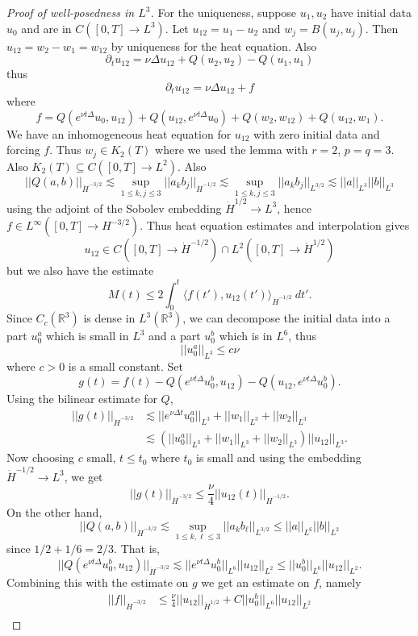 \documentclass[12pt]{book}
\newcommand{\RR}{\mathbb{R}}
\theoremstyle{definition}
\begin{document}
\begin{proof}[Proof of well-posedness in $L^3$]
For the uniqueness, suppose $u_1, u_2$ have initial data $u_0$ and are in $C([0, T] \to L^3)$.
Let $u_{12} = u_1 - u_2$ and $w_j = B(u_j, u_j)$. Then $u_{12} = w_2 - w_1 = w_{12}$ by uniqueness for the heat equation.
Also
$$\partial_t u_{12} = \nu \Delta u_{12} + Q(u_2, u_2) - Q(u_1, u_1)$$
thus
$$\partial_t u_{12} = \nu \Delta u_{12} + f$$
where
$$f = Q(e^{\nu t \Delta} u_0, u_{12}) + Q(u_{12}, e^{\nu t \Delta} u_0) + Q(w_2, w_{12}) + Q(u_{12}, w_1).$$
We have an inhomogeneous heat equation for $u_{12}$ with zero initial data and forcing $f$.
Thus $w_j \in K_2(T)$ where we used the lemma with $r = 2$, $p = q = 3$.
Also $K_2(T) \subseteq C([0, T] \to L^2)$.
Also
$$||Q(a, b)||_{\dot H^{-3/2}} \lesssim \sup_{1 \leq k, j \leq 3} ||a_k b_j||_{\dot H^{-1/2}} \lesssim \sup_{1 \leq k, j \leq 3} ||a_k b_j||_{L^{3/2}} \lesssim ||a||_{L^3} ||b||_{L^3}$$
using the adjoint of the Sobolev embedding $\dot H^{1/2} \to L^3$, hence $f \in L^\infty([0, T] \to H^{-3/2})$.
Thus heat equation estimates and interpolation gives
$$u_{12} \in C([0, T] \to \dot H^{-1/2}) \cap L^2([0, T] \to \dot H^{1/2})$$
but we also have the estimate
$$M(t) \leq 2 \int_0^t \langle f(t'), u_{12}(t')\rangle_{\dot H^{-1/2}} ~dt'.$$
Since $C_c(\RR^3)$ is dense in $L^3(\RR^3)$, we can decompose the initial data into a part $u_0^a$ which is small in $L^3$ and a part $u_0^b$ which is in $L^6$, thus
$$||u_0^a||_{L^3} \leq c\nu$$
where $c > 0$ is a small constant.
Set
$$g(t) = f(t) - Q(e^{\nu t\Delta} u_0^b, u_{12}) - Q(u_{12}, e^{\nu t\Delta} u_0^b).$$
Using the bilinear estimate for $Q$,
\begin{align*}
||g(t)||_{\dot H^{-3/2}} &\lesssim ||e^{\nu \Delta t} u_0^a||_{L^3} + ||w_1||_{L^3} + ||w_2||_{L^3}\\
&\lesssim (||u_0^a||_{L^3} + ||w_1||_{L^3} + ||w_2||_{L^3}) ||u_{12}||_{L^3}.
\end{align*}
Now choosing $c$ small, $t \leq t_0$ where $t_0$ is small and using the embedding $\dot H^{-1/2} \to L^3$, we get
$$||g(t)||_{\dot H^{-3/2}} \leq \frac{\nu}{4}||u_{12}(t)||_{\dot H^{-1/2}}.$$
On the other hand,
$$||Q(a, b)||_{\dot H^{-3/2}} \lesssim \sup_{1 \leq k,\ell \leq 3} ||a_k b_\ell||_{L^{3/2}} \leq ||a||_{L^6} ||b||_{L^2}$$
since $1/2 + 1/6 = 2/3$.
That is,
$$||Q(e^{\nu t \Delta} u_0^b, u_{12})||_{\dot H^{-3/2}} \lesssim ||e^{\nu t\Delta}u_0^b||_{L^6} ||u_{12}||_{L^2} \leq ||u_0^b||_{L^6} ||u_{12}||_{L^2}.$$
Combining this with the estimate on $g$ we get an estimate on $f$, namely
\begin{align*}
||f||_{\dot H^{-3/2}} &\leq \frac{\nu}{4}||u_{12}||_{\dot H^{1/2}} + C||u_0^b||_{L^6} ||u_{12}||_{L^2}\\

\end{align*}
\end{proof}
\end{document}
